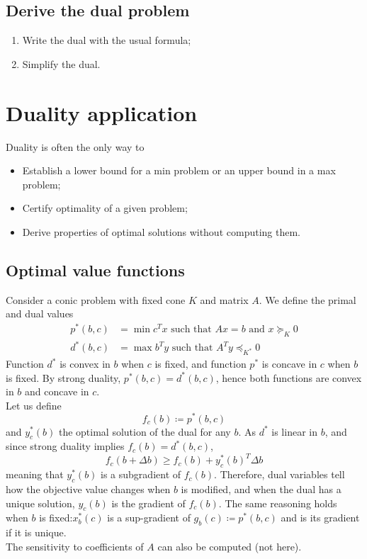 \documentclass[12pt, openany]{report}
\theoremstyle{definition}
\begin{document}
\subsection{Derive the dual problem}
\begin{enumerate}
    \item Write the dual with the usual formula;
    \item Simplify the dual.
\end{enumerate}
\section{Duality application}
Duality is often the only way to 
\begin{itemize}
    \item Establish a lower bound for a min problem or an upper bound in a max problem;
    \item Certify optimality of a given problem;
    \item Derive properties of optimal solutions without computing them.
\end{itemize}
\subsection{Optimal value functions}
Consider a conic problem with fixed cone $K$ and matrix $A$. We define the primal and dual values 
\begin{equation}
    \begin{aligned}
        p^*(b,c) &= \min c^Tx \text{ such that } Ax=b \text{ and }x\succeq_K0\\
        d^*(b,c) &= \max b^Ty \text{ such that }A^Ty\preceq_{K^*}0
    \end{aligned}
\end{equation}
Function $d^*$ is convex in $b$ when $c$ is fixed, and function $p^*$ is concave in $c$ when $b$ is fixed. By strong duality, $p^*(b,c)=d^*(b,c)$, hence both functions are convex in $b$ and concave in $c$. \\

Let us define 
\begin{equation}
    f_c(b) \coloneqq p^*(b,c)
\end{equation}
and $y_c^*(b)$ the optimal solution of the dual for any $b$. As $d^*$ is linear in $b$, and since strong duality implies $f_c(b) = d^*(b,c)$, 
\begin{equation}
    f_c(b+\Delta b) \ge f_c(b)+y_c^*(b)^T\Delta b
\end{equation}
meaning that $y_c^*(b)$ is a subgradient of $f_c(b)$. Therefore, dual variables tell how the objective value changes when $b$ is modified, and when the dual has a unique solution, $y_c(b)$ is the gradient of $f_c(b)$. The same reasoning holds when $b$ is fixed:$x_b^*(c)$ is a sup-gradient of $g_b(c)\coloneqq p^*(b,c)$ and is its gradient if it is unique. \\
The sensitivity to coefficients of $A$ can also be computed (not here).
\end{document}
